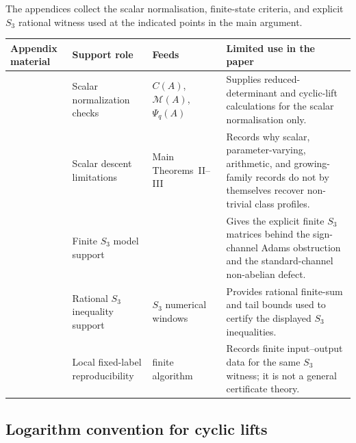 \documentclass[11pt,a4paper]{amsart}
\theoremstyle{plain}
\theoremstyle{definition}
\theoremstyle{remark}
\begin{document}
The appendices collect the scalar normalisation, finite-state criteria, and
explicit \(S_3\) rational witness used at the indicated points in the main
argument.
\begin{center}
\begin{tabular}{@{}L{0.24\textwidth}L{0.21\textwidth}L{0.19\textwidth}L{0.26\textwidth}@{}}
\toprule
Appendix material & Support role & Feeds & Limited use in the paper \\
\midrule
{}
& Scalar normalization checks
& \(C(A)\), \(\mathcal M(A)\), \(\Psi_q(A)\)
& Supplies reduced-determinant and cyclic-lift calculations for the scalar
normalisation only. \\
& Scalar descent limitations
& Main Theorems~II--III
& Records why scalar, parameter-varying, arithmetic, and growing-family
records do not by themselves recover non-trivial class profiles. \\
& Finite \(S_3\) model support
& 
& Gives the explicit finite \(S_3\) matrices behind the sign-channel
Adams obstruction and the standard-channel non-abelian defect. \\
& Rational \(S_3\) inequality support
& \(S_3\) numerical windows
& Provides rational finite-sum and tail bounds used to certify the
displayed \(S_3\) inequalities. \\
& Local fixed-label reproducibility
& finite algorithm
& Records finite input--output data for the same \(S_3\) witness; it is not a
general certificate theory. \\
\bottomrule
\end{tabular}
\end{center}

\subsection{Logarithm convention for cyclic lifts}
\end{document}
